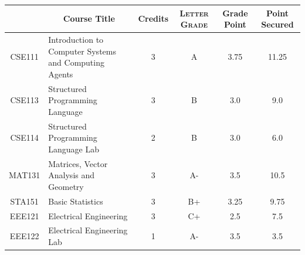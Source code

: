 \documentclass[11pt]{article}
\newcommand*{\numtwo}[1]{\pgfmathprintnumber[
                    fixed, precision=2, fixed zerofill=true]{#1}}
\begin{document}
                \begin{center}
                    \renewcommand{\arraystretch}{1.08}
                    
                \begin{tabular}{|c|l|c|>{\scshape}c|c|c|}
                \hline  \rule[-1ex]{0pt}{3.5ex} {\centering{\bf Course Code}} &  \multicolumn{1}{c|}{\textbf{Course Title}}  & {\bf Credits} & {\bf Letter Grade} & {\bf Grade Point} & {\bf Point Secured}  \\ 
                \hline   CSE111 &  Introduction to Computer Systems and Computing Agents		 & 3 & A & 3.75 & 11.25 \\ %
                \hline   CSE113 &  Structured Programming Language		 & 3 & B & 3.0 & 9.0 \\ %
                \hline   CSE114 &  Structured Programming Language Lab		 & 2 & B & 3.0 & 6.0 \\ %
                \hline   MAT131 &  Matrices, Vector Analysis and Geometry		 & 3 & A- & 3.5 & 10.5 \\ %
                \hline   STA151 &  Basic Statistics		 & 3 & B+ & 3.25 & 9.75 \\ %
                \hline   EEE121 &  Electrical Engineering		 & 3 & C+ & 2.5 & 7.5 \\ %
                \hline   EEE122 &  Electrical Engineering Lab		 & 1 & A- & 3.5 & 3.5 \\ %

\hline                %
                \end{tabular}
                \end{center}
                \renewcommand{\arraystretch}{1.03}
\end{document}
